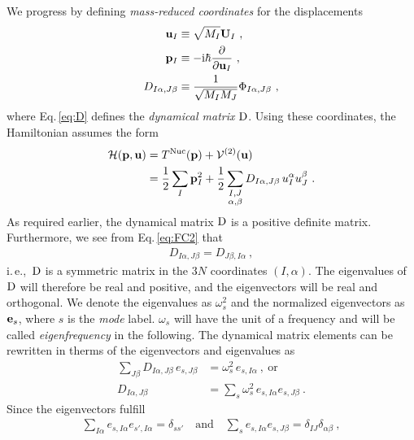 We progress by defining \emph{mass-reduced coordinates} for the displacements
\begin{align}
	{\bf u}_I 
		&\equiv \sqrt{M_I} {\bf U}_I~, 
		\label{eq:uI} \\
	{\bf p}_I 
		&\equiv -{\rm i} \hbar \frac{\partial}{\partial {\bf u}_I}~,
		\label{eq:pI} \\
	D_{I \alpha, J \beta}
		&\equiv \frac{1}{\sqrt{M_I M_J}} 
		\Phi_{I \alpha, J \beta}~,
		\label{eq:D}
\end{align}
where Eq.\,\eqref{eq:D} defines the \emph{dynamical matrix} $\rm D$.
Using these coordinates, the Hamiltonian assumes the form
\begin{align}
	\begin{split}
		\mathcal{H}({\bf p}, {\bf u})
			&= T^{\rm Nuc} ({\bf p}) + \mathcal{V}^{(2)} ({\bf u})\\
			&= \frac{1}{2} \sum_I {\bf p}_I^2 + 
				\frac{1}{2} \sum_{\substack{I, J \\ \alpha, \beta}}
					D_{I \alpha, J \beta}
					\, u_I^\alpha u_J^\beta~.
	\end{split}
	\label{eq:ha.H1}
\end{align}
As required earlier, the dynamical matrix $\rm D$ is a positive definite matrix. Furthermore, we see from Eq.\,\eqref{eq:FC2} that
\begin{align}
	D_{I \alpha, J \beta} = D_{J \beta, I \alpha}~,
	\label{eq:D.symmetric}
\end{align}
i.\,e.,~$\rm D$ is a symmetric matrix in the $3N$ coordinates $(I, \alpha)$. The eigenvalues of $\rm D$ will therefore be real and positive, and the eigenvectors will be real and orthogonal. We denote the eigenvalues as $\omega_s^2$ and the normalized eigenvectors as ${\bf e}_s$, where $s$ is the \emph{mode} label. $\omega_s$ will have the unit of a frequency and  will be called \emph{eigenfrequency} in the following. The dynamical matrix elements can be rewritten in therms of the eigenvectors and eigenvalues as
\begin{align}
	\sum_{J \beta}
		D_{I \alpha, J \beta} \, e_{s, J \beta} 
			&= \omega^2_s \, e_{s, I \alpha}~,~\text{or} 
			\label{eq:sum_D_IJ} \\
		D_{I \alpha, J \beta}
			&= \sum_s \omega^2_s \, e_{s, I \alpha} e_{s, J \beta}~.
			\label{eq:D_IJs}
\end{align}
Since the eigenvectors fulfill
\begin{align}
	\sum_{I \alpha} e_{s, I \alpha} e_{s', I \alpha} = \delta_{s s'}
	\quad \text{and} \quad
	\sum_{s} e_{s, I \alpha} e_{s, J \beta} = \delta_{IJ} \delta_{\alpha \beta}~,
\end{align}
